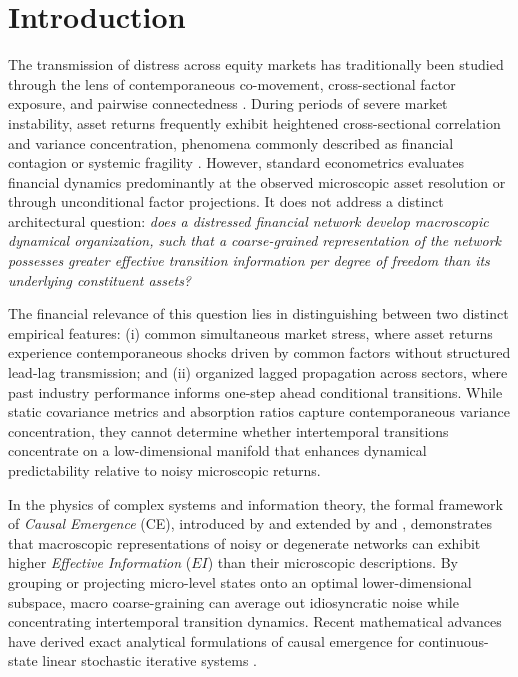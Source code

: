 \documentclass[review,12pt,authoryear]{elsarticle}
\begin{document}
\doublespacing

\section{Introduction}
\label{sec:intro}

The transmission of distress across equity markets has traditionally been studied through the lens of contemporaneous co-movement, cross-sectional factor exposure, and pairwise connectedness \citep{billio2012econometric, diebold2012better, adrian2016covar, brownlees2017srisk}. During periods of severe market instability, asset returns frequently exhibit heightened cross-sectional correlation and variance concentration, phenomena commonly described as financial contagion or systemic fragility \citep{acharya2017measuring, kritzman2011principal}. However, standard econometrics evaluates financial dynamics predominantly at the observed microscopic asset resolution or through unconditional factor projections. It does not address a distinct architectural question: \emph{does a distressed financial network develop macroscopic dynamical organization, such that a coarse-grained representation of the network possesses greater effective transition information per degree of freedom than its underlying constituent assets?}

The financial relevance of this question lies in distinguishing between two distinct empirical features: (i) common simultaneous market stress, where asset returns experience contemporaneous shocks driven by common factors without structured lead-lag transmission; and (ii) organized lagged propagation across sectors, where past industry performance informs one-step ahead conditional transitions. While static covariance metrics and absorption ratios capture contemporaneous variance concentration, they cannot determine whether intertemporal transitions concentrate on a low-dimensional manifold that enhances dynamical predictability relative to noisy microscopic returns.

In the physics of complex systems and information theory, the formal framework of \emph{Causal Emergence} (CE), introduced by \citet{hoel2013quantifying} and extended by \citet{klein2020emergence} and \citet{rosas2020reconciling}, demonstrates that macroscopic representations of noisy or degenerate networks can exhibit higher \emph{Effective Information} ($EI$) than their microscopic descriptions. By grouping or projecting micro-level states onto an optimal lower-dimensional subspace, macro coarse-graining can average out idiosyncratic noise while concentrating intertemporal transition dynamics. Recent mathematical advances have derived exact analytical formulations of causal emergence for continuous-state linear stochastic iterative systems \citep{liu2024exact, liu2025singular, yang2025finding}.
\end{document}

